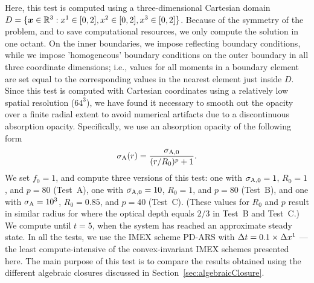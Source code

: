 Here, this test is computed using a three-dimensional Cartesian domain $D=\{\boldsymbol{x}\in\mathbb{R}^{3}:x^{1}\in[0,2], x^{2}\in[0,2], x^{3}\in[0,2]\}$.  
Because of the symmetry of the problem, and to save computational resources, we only compute the solution in one octant.  
On the inner boundaries, we impose reflecting boundary conditions, while we impose 'homogeneous' boundary conditions on the outer boundary in all three coordinate dimensions; i.e., values for all moments in a boundary element are set equal to the corresponding values in the nearest element just inside $D$.  
Since this test is computed with Cartesian coordinates using a relatively low spatial resolution ($64^{3}$), we have found it necessary to smooth out the opacity over a finite radial extent to avoid numerical artifacts due to a discontinuous absorption opacity.  
Specifically, we use an absorption opacity of the following form
\begin{equation}
  \sigma_{{\rm A}}(r)=\frac{\sigma_{{\rm A},0}}{(r/R_{0})^{p}+1}.  
\end{equation}
We set $f_{0}=1$, and compute three versions of this test: one with $\sigma_{{\rm A},0}=1$, $R_{0}=1$, and $p=80$ (Test~A), one with $\sigma_{{\rm A},0}=10$, $R_{0}=1$, and $p=80$ (Test~B), and one with $\sigma_{{\rm A}}=10^{3}$, $R_{0}=0.85$, and $p=40$ (Test~C).  
(These values for $R_{0}$ and $p$ result in similar radius for where the optical depth equals $2/3$ in Test~B and Test~C.)
We compute until $t=5$, when the system has reached an approximate steady state.  
In all the tests, we use the IMEX scheme PD-ARS with $\Delta t=0.1\times\Delta x^{1}$ --- the least compute-intensive of the convex-invariant IMEX schemes presented here.  
The main purpose of this test is to compare the results obtained using the different algebraic closures discussed in Section~\ref{sec:algebraicClosure}.  

